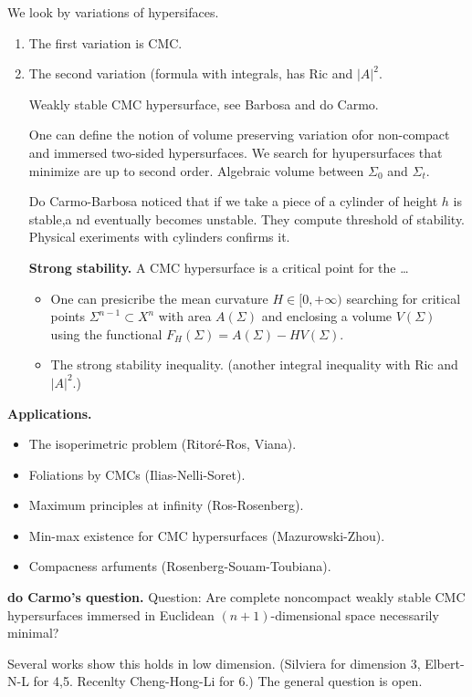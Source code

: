 We look by variations of hypersifaces.
\begin{enumerate}
\item The first variation is CMC.
\item The second variation (formula with
integrals, has Ric and $|A|^2$.

Weakly stable CMC hypersurface, see Barbosa
and do Carmo.

One can define the notion of volume
preserving variation ofor non-compact and
immersed two-sided hypersurfaces. We search
for hyupersurfaces that minimize are up to
second order. Algebraic volume between
$\Sigma_0 $ and $\Sigma_t$.

Do Carmo-Barbosa noticed that if we take a
piece of a cylinder of height $h$ is
stable,a nd eventually becomes unstable.
They compute threshold of stability.
Physical exeriments with cylinders confirms
it.

\medskip\noindent
{\bf Strong stability.}
A CMC hypersurface is a critical point for
the … 

\begin{itemize}
\item One can presicribe the mean curvature
$H \in [0,+\infty)$ searching for critical
points $\Sigma^{n-1}\subset X^n$ with area
$A(\Sigma)$ and enclosing a volume
$V(\Sigma)$ using the functional
$F_H(\Sigma)=A(\Sigma) - H V(\Sigma)$.
\item  The strong stability inequality.
(another integral inequality with Ric and
$|A|^2$.)
\end{itemize}
\end{enumerate}

\medskip\noindent
{\bf Applications.}
\begin{itemize}
\item The isoperimetric problem (Ritoré-Ros,
Viana).
\item Foliations by CMCs (Ilias-Nelli-Soret).
\item Maximum principles at infinity
(Ros-Rosenberg).
\item Min-max existence for CMC
hypersurfaces (Mazurowski-Zhou).
\item Compacness arfuments
(Rosenberg-Souam-Toubiana).
\end{itemize}

\medskip\noindent
{\bf do Carmo's question.}
Question: Are complete noncompact weakly
stable CMC hypersurfaces immersed in
Euclidean $(n+1)$-dimensional space
necessarily minimal?

Several works show this holds in low
dimension. (Silviera for dimension 3,
Elbert-N-L for 4,5. Recenlty Cheng-Hong-Li
for 6.) The general question is open.


